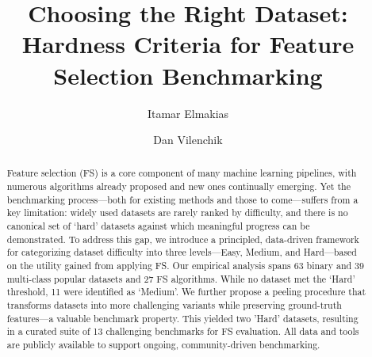 \documentclass[preprint,12pt,authoryear]{elsarticle}
\begin{document}
\begin{frontmatter}
    \title{Choosing the Right Dataset: Hardness Criteria for Feature Selection Benchmarking}

\author[aff1]{Itamar Elmakias}

\author[aff1]{Dan Vilenchik}



\begin{abstract}

Feature selection (FS) is a core component of many machine learning pipelines, with numerous algorithms already proposed and new ones continually emerging. Yet the benchmarking process—both for existing methods and those to come—suffers from a key limitation: widely used datasets are rarely ranked by difficulty, and there is no canonical set of ‘hard’ datasets against which meaningful progress can be demonstrated. To address this gap, we introduce a principled, data-driven framework for categorizing dataset difficulty into three levels—Easy, Medium, and Hard—based on the utility gained from applying FS. Our empirical analysis spans 63 binary and 39 multi-class popular datasets and 27 FS algorithms. While no dataset met the ‘Hard’ threshold, 11 were identified as ‘Medium’. We further propose a peeling procedure that transforms datasets into more challenging variants while preserving ground-truth features—a valuable benchmark property. This yielded two  'Hard' datasets, resulting in a curated suite of 13 challenging benchmarks for FS evaluation. All data and tools are publicly available to support ongoing, community-driven benchmarking.


\end{abstract}



\end{frontmatter}
\end{document}
